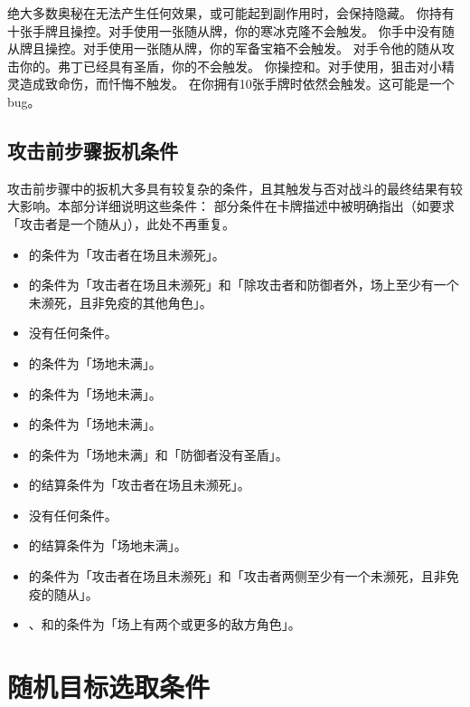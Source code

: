 绝大多数奥秘在无法产生任何效果，或可能起到副作用时，会保持隐藏。
\example 你持有十张手牌且操控。对手使用一张随从牌，你的寒冰克隆不会触发。
\example 你手中没有随从牌且操控。对手使用一张随从牌，你的军备宝箱不会触发。
\example 对手令他的随从攻击你的。弗丁已经具有圣盾，你的不会触发。
\example 你操控和。对手使用，狙击对小精灵造成致命伤，而忏悔不触发。
\exception {}在你拥有10张手牌时依然会触发。这可能是一个bug。

\subsection{攻击前步骤扳机条件}

攻击前步骤中的扳机大多具有较复杂的条件，且其触发与否对战斗的最终结果有较大影响。本部分详细说明这些条件：
\notice 部分条件在卡牌描述中被明确指出（如要求「攻击者是一个随从」），此处不再重复。

\begin{itemize}
    \item {}的条件为「攻击者在场且未濒死」。
    \item {}的条件为「攻击者在场且未濒死」和「除攻击者和防御者外，场上至少有一个未濒死，且非免疫的其他角色」。
    \item {}没有任何条件。
    \item {}的条件为「场地未满」。
    \item {}的条件为「场地未满」。
    \item {}的条件为「场地未满」。
    \item {}的条件为「场地未满」和「防御者没有圣盾」。
    \item {}的结算条件为「攻击者在场且未濒死」。
    \item {}没有任何条件。
    \item {}的结算条件为「场地未满」。
    \item {}的条件为「攻击者在场且未濒死」和「攻击者两侧至少有一个未濒死，且非免疫的随从」。
    \item {}、和的条件为「场上有两个或更多的敌方角色」。
\end{itemize}

\section{随机目标选取条件}

